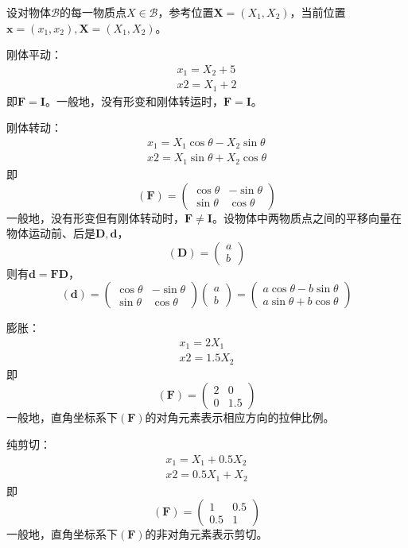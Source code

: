 \documentclass[main.tex]{subfiles}
\begin{document}
\begin{example}
设对物体$\mathcal{B}$的每一物质点$X\in\mathcal{B}$，参考位置$\mathbf{X}=\left(X_1,X_2\right)$，当前位置$\mathbf{x}=\left(x_1,x_2\right),\mathbf{X}=\left(X_1,X_2\right)$。

刚体平动：
\[\begin{array}{l}
x_1=X_2+5\\
x2=X_1+2
\end{array}\]
即$\mathbf{F}=\mathbf{I}$。一般地，没有形变和刚体转运时，$\mathbf{F}=\mathbf{I}$。

刚体转动：
\[\begin{array}{l}
x_1=X_1\cos\theta-X_2\sin\theta\\
x2=X_1\sin\theta+X_2\cos\theta
\end{array}\]
即
\[\left(\mathbf{F}\right)=\left(\begin{array}{cc}
\cos\theta&-\sin\theta\\
\sin\theta&\cos\theta\end{array}\right)\]
一般地，没有形变但有刚体转动时，$\mathbf{F}\neq\mathbf{I}$。设物体中两物质点之间的平移向量在物体运动前、后是$\mathbf{D},\mathbf{d}$，
\[\left(\mathbf{D}\right)=\left(\begin{array}{c}a\\b\end{array}\right)\]
则有$\mathbf{d}=\mathbf{FD}$，
\[\left(\mathbf{d}\right)=\left(\begin{array}{cc}
\cos\theta&-\sin\theta\\
\sin\theta&\cos\theta\end{array}\right)\left(\begin{array}{c}a\\b\end{array}\right)=\left(\begin{array}{c}a\cos\theta-b\sin\theta\\a\sin\theta+b\cos\theta\end{array}\right)\]

膨胀：
\[\begin{array}{l}
x_1=2X_1\\
x2=1.5X_2
\end{array}\]
即
\[\left(\mathbf{F}\right)=\left(\begin{array}{cc}2&0\\0&1.5\end{array}\right)\]
一般地，直角坐标系下$\left(\mathbf{F}\right)$的对角元素表示相应方向的拉伸比例。

纯剪切：
\[\begin{array}{l}
x_1=X_1+0.5X_2\\
x2=0.5X_1+X_2
\end{array}\]
即
\[\left(\mathbf{F}\right)=\left(\begin{array}{cc}1&0.5\\0.5&1\end{array}\right)\]
一般地，直角坐标系下$\left(\mathbf{F}\right)$的非对角元素表示剪切。


\end{example}
\end{document}
